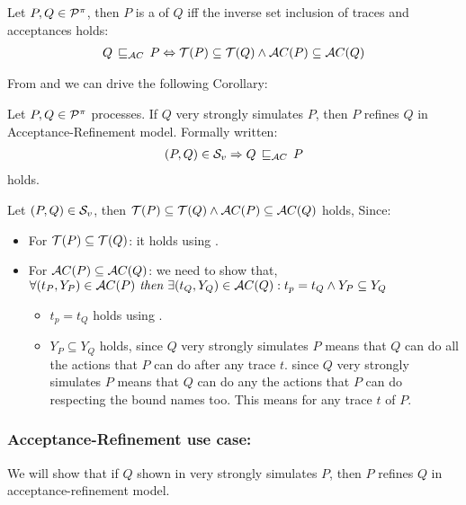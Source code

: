 \begin{definition}
\label{def_failure_ref}
	Let $P,Q\in\mathcal P^{\pi}$, then $P$ is a  of $Q$ iff the inverse set inclusion of traces and acceptances holds:
\begin{align}
   Q \refiAC P \Leftrightarrow  \Traces[P]\subseteq\Traces[Q] \wedge \Accepatances[P]\subseteq\Accepatances[Q]
\end{align}
\end{definition}

From  and  we can drive the following Corollary: 

\begin{cor}
\label{cor_sim_acceptance_refinement}
Let $P,Q\in\mathcal P^{\pi}$ processes. If $Q$ very strongly simulates $P$, then $P$ refines $Q$ in Acceptance-Refinement model. Formally written:
\begin{align}
    (P,Q)\in{}\simuv \Rightarrow Q \refiAC P
   \label{acceptance_model}
\end{align}
holds.
\end{cor}%

\begin{prf}
Let $(P,Q)\in{}\mathcal{S}_v$, then $\Traces[P]\subseteq\Traces[Q] \wedge \Accepatances[P]\subseteq\Accepatances[Q]$ holds, Since:
\begin{itemize}
\item For $\Traces[P]\subseteq\Traces[Q]$: it holds using .
\item For $\Accepatances[P]\subseteq\Accepatances[Q]$: we need to show that,\\$\forall (t_P, Y_P) \in \Accepatances[P] \textit{ then } \exists (t_Q, Y_Q) \in \Accepatances[Q]: t_p = t_Q \wedge Y_P \subseteq Y_Q$
\begin{itemize}
\item $t_p = t_Q$ holds using .
\item $Y_P \subseteq Y_Q$ holds, since $Q$ very strongly simulates $P$ means that $Q$ can do all the actions that $P$ can do after any trace $t$. since $Q$ very strongly simulates $P$ means that $Q$ can do any the actions that $P$ can do respecting the bound names too. This means for any trace $t$ of $P$.
\end{itemize}
\end{itemize}
\end{prf}
\subsubsection{Acceptance-Refinement use case:}
 We will show that if $Q$ shown in  very strongly simulates $P$, then $P$ refines $Q$ in acceptance-refinement model.
 
